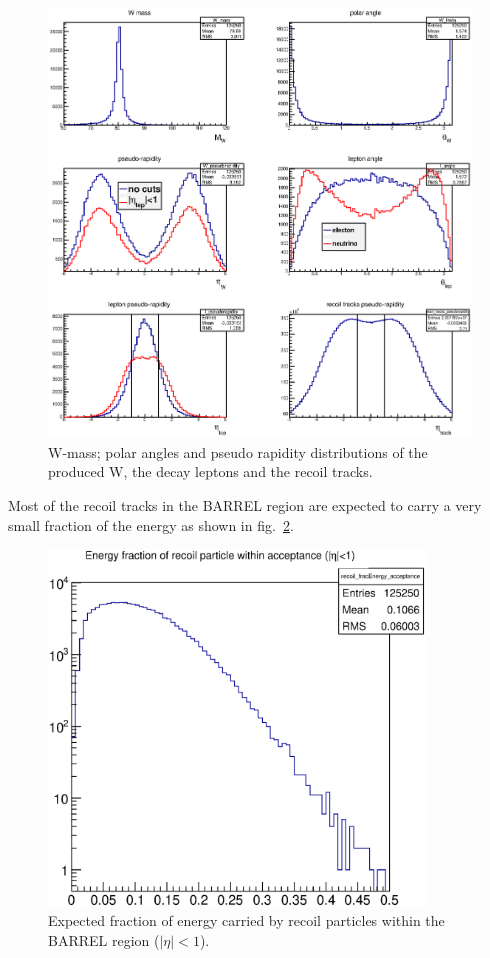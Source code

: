 \documentclass[12pt]{article}
\begin{document}
\begin{figure}[tbhp]
\begin{center}
\includegraphics[width=14cm]{images/W_rapidity.eps}
\end{center}
\caption{\label{fig:MC_W_eta} W-mass; polar angles and pseudo rapidity distributions of the produced W, the decay leptons and the recoil tracks.}
\end{figure}

Most of the recoil tracks in the BARREL region are expected to carry a very
small fraction of the energy as shown in fig.~\ref{fig:MC_recoil_Efrac}.

\begin{figure}[tbhp]
\begin{center}
\includegraphics[width=10cm]{images/recoil_energy_frac.eps}
\end{center}
\caption{\label{fig:MC_recoil_Efrac} Expected fraction of energy carried by recoil particles within the BARREL region ($|\eta|<1$).}
\end{figure}
\end{document}
